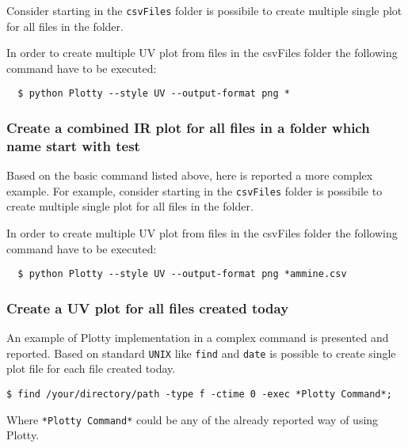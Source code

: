 \documentclass[../Master.tex]{subfiles}
\begin{document}
Consider starting in the \texttt{csvFiles} folder is possibile to create multiple single plot for all files in the folder.\\


In order to create multiple UV plot from files in the csvFiles folder the following command have to be executed:

\begin{lstlisting}
  $ python Plotty --style UV --output-format png *
\end{lstlisting}

\subsubsection{Create a combined IR plot for all files in a folder which name start with test}

Based on the basic command listed above, here is reported a more complex example.
For example, consider starting in the \texttt{csvFiles} folder is possibile to create multiple single plot for all files in the folder.\\


In order to create multiple UV plot from files in the csvFiles folder the following command have to be executed:

\begin{lstlisting}
  $ python Plotty --style UV --output-format png *ammine.csv
\end{lstlisting}

\subsubsection{Create a UV plot for all files created today}
An example of Plotty implementation in a complex command is presented and reported. Based on standard \texttt{UNIX} like \texttt{find} and \texttt{date} is possible to create single plot file for each file created today.\\
\begin{lstlisting}
$ find /your/directory/path -type f -ctime 0 -exec *Plotty Command*;
\end{lstlisting}
Where \texttt{*Plotty Command*} could be any of the already reported way of using Plotty.
\end{document}
